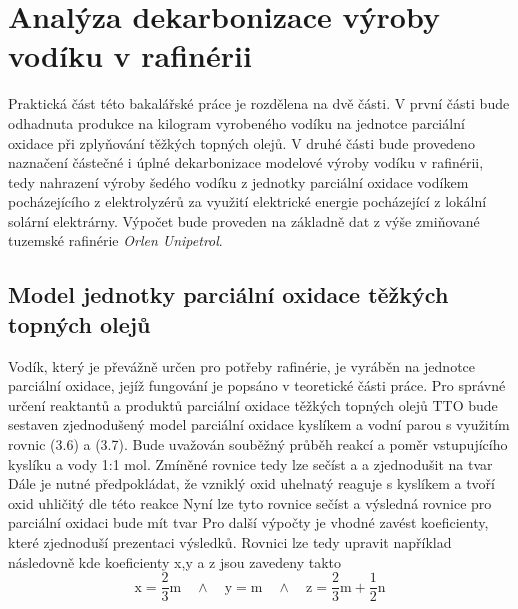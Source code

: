 \chapter{Analýza dekarbonizace výroby vodíku v rafinérii}

Praktická část této bakalářské práce je rozdělena na dvě části. V první části bude odhadnuta produkce  na kilogram vyrobeného vodíku na jednotce parciální oxidace při zplyňování těžkých topných olejů. V druhé části bude provedeno naznačení částečné i úplné dekarbonizace modelové výroby vodíku v rafinérii, tedy nahrazení výroby šedého vodíku z jednotky parciální oxidace vodíkem pocházejícího z elektrolyzérů za využití elektrické energie pocházející z lokální solární elektrárny. Výpočet bude proveden na základně dat z výše zmiňované tuzemské rafinérie \textit{Orlen Unipetrol}.

\section{Model jednotky parciální oxidace těžkých topných olejů}

Vodík, který je převážně určen pro potřeby rafinérie, je vyráběn na jednotce parciální oxidace, jejíž fungování je popsáno v teoretické části práce. Pro správné určení reaktantů a produktů parciální oxidace těžkých topných olejů \acs{TTO} bude sestaven zjednodušený model parciální oxidace kyslíkem a vodní parou s využitím rovnic (3.6) a (3.7). Bude uvažován souběžný průběh reakcí a poměr vstupujícího kyslíku a vody 1:1 mol. Zmíněné rovnice tedy lze sečíst a a zjednodušit na tvar
Dále je nutné předpokládat, že vzniklý oxid uhelnatý reaguje s kyslíkem a tvoří oxid uhličitý dle této reakce
Nyní lze tyto rovnice sečíst a výsledná rovnice pro parciální oxidaci bude mít tvar
Pro další výpočty je vhodné zavést koeficienty, které zjednoduší prezentaci výsledků. Rovnici lze tedy upravit například následovně
kde koeficienty x,y a z jsou zavedeny takto
\begin{equation}
    \mathrm{x} = \frac{2}{3}\mathrm{m} \quad \wedge \quad \mathrm{y} = \mathrm{m} \quad \wedge \quad \mathrm{z} = \mathrm{\frac{2}{3} m + \frac{1}{2} n}
\end{equation}
\label{eq:koeficienty}


